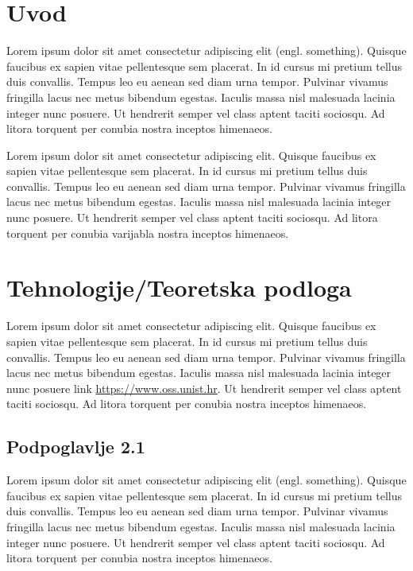\chapter{Uvod}
Lorem ipsum dolor sit amet consectetur adipiscing elit (engl. something). Quisque faucibus ex sapien vitae pellentesque sem placerat. In id cursus mi pretium tellus duis convallis. Tempus leo eu aenean sed diam urna tempor. Pulvinar vivamus fringilla lacus nec metus bibendum egestas. Iaculis massa nisl malesuada lacinia integer nunc posuere. Ut hendrerit semper vel class aptent taciti sociosqu. Ad litora torquent per conubia nostra inceptos himenaeos.

Lorem ipsum dolor sit amet consectetur adipiscing elit. Quisque faucibus ex sapien vitae pellentesque sem placerat. In id cursus mi pretium tellus duis convallis. Tempus leo eu aenean sed diam urna tempor. Pulvinar vivamus fringilla lacus nec metus bibendum egestas. Iaculis massa nisl malesuada lacinia integer nunc posuere. Ut hendrerit semper vel class aptent taciti sociosqu. Ad litora torquent per conubia varijabla nostra inceptos himenaeos.

\chapter{Tehnologije/Teoretska podloga}
Lorem ipsum dolor sit amet consectetur adipiscing elit. Quisque faucibus ex sapien vitae pellentesque sem placerat. In id cursus mi pretium tellus duis convallis. Tempus leo eu aenean sed diam urna tempor. Pulvinar vivamus fringilla lacus nec metus bibendum egestas. Iaculis massa nisl malesuada lacinia integer nunc posuere link \url{https://www.oss.unist.hr}. Ut hendrerit semper vel class aptent taciti sociosqu. Ad litora torquent per conubia nostra inceptos himenaeos.

\section{Podpoglavlje 2.1}
Lorem ipsum dolor sit amet consectetur adipiscing elit (engl. something). Quisque faucibus ex sapien vitae pellentesque sem placerat. In id cursus mi pretium tellus duis convallis. Tempus leo eu aenean sed diam urna tempor. Pulvinar vivamus fringilla lacus nec metus bibendum egestas. Iaculis massa nisl malesuada lacinia integer nunc posuere. Ut hendrerit semper vel class aptent taciti sociosqu. Ad litora torquent per conubia nostra inceptos himenaeos.

